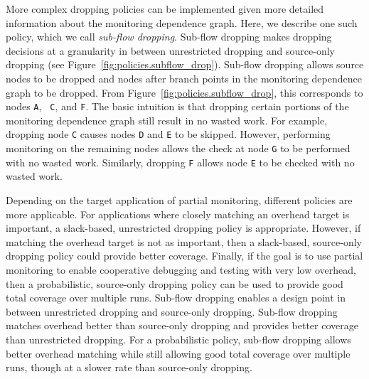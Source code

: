 More complex dropping policies can be implemented given more detailed
information about the monitoring dependence graph. Here, we describe one such
policy, which we call \emph{sub-flow dropping}. Sub-flow dropping makes
dropping decisions at a granularity in between unrestricted dropping and
source-only dropping (see Figure~\ref{fig:policies.subflow_drop}). Sub-flow
dropping allows source nodes to be dropped and nodes after branch points in the
monitoring dependence graph to be dropped. From
Figure~\ref{fig:policies.subflow_drop}, this corresponds to nodes {\tt A}, {\tt
C}, and {\tt F}. The basic intuition is that dropping certain portions of the
monitoring dependence graph still result in no wasted work. For example,
dropping node {\tt C} causes nodes {\tt D} and {\tt E} to be skipped. However,
performing monitoring on the remaining nodes allows the check at node {\tt G}
to be performed with no wasted work. Similarly, dropping {\tt F} allows node
{\tt E} to be checked with no wasted work.

Depending on the target application of partial monitoring, different policies
are more applicable.
For applications where closely matching an overhead target is important, a
slack-based, unrestricted dropping policy is appropriate. However, if matching
the overhead target is not as important, then a slack-based, source-only dropping
policy could provide better coverage. 
Finally, if the goal is to use partial monitoring to enable cooperative
debugging and testing with very low overhead, then a probabilistic,
source-only dropping policy can be used to provide good total coverage over
multiple runs.
Sub-flow dropping enables a design point in between unrestricted dropping and
source-only dropping. Sub-flow dropping matches overhead better than
source-only dropping and provides better coverage than unrestricted dropping.
For a probabilistic policy, sub-flow dropping allows better overhead matching
while still allowing good total coverage over multiple runs, though at a slower
rate than source-only dropping.

